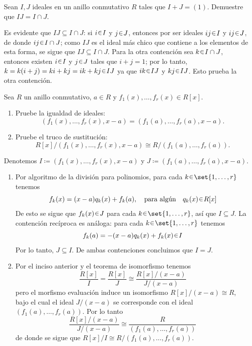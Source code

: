 \begin{ejer}
Sean $I , J$ ideales en un anillo conmutativo $R$ tales que $I + J = (1)$. Demuestre que $IJ = I \cap J$.
\end{ejer}
\begin{sol}[Demostración]
Es evidente que $IJ \subseteq I \cap J$: si $i \en I$ y $j \en J$, entonces por ser ideales $ij \en I$ y $ij \en J$, de donde $ij \en I \cap J$; como $IJ$ es el ideal más chico que contiene a los elementos de esta forma, se sigue que $IJ \subseteq I \cap J$. Para la otra contención sea $k \en I \cap J$, entonces existen $i \en I$ y $j \en J$ tales que $i + j = 1$; por lo tanto, $k = k(i + j) = ki + kj = ik + kj \en IJ$ ya que $ik \en IJ$ y $kj \en IJ$. Esto prueba la otra contención.
\end{sol}

\begin{ejer}
Sea $R$ un anillo conmutativo, $a \in R$ y $f_1(x), \ldots, f_r(x) \in R[x]$.
\begin{enumerate}[label=(\alph*)]
\item Pruebe la igualdad de ideales:
\[
(f_1(x), \ldots, f_r(x), x - a) = (f_1(a), \ldots, f_r(a), x - a).
\]
\item Pruebe el truco de sustitución:
\[
R[x]/(f_1(x), \ldots, f_r(x), x - a) \cong R/(f_1(a), \ldots, f_r(a)).
\]
\end{enumerate}
\end{ejer}
\begin{sol}[Demostración]
Denotemos $I \coloneq(f_1(x), \ldots, f_r(x), x - a)$ y $J \coloneq (f_1(a), \ldots, f_r(a), x - a)$.
\begin{enumerate}[label=(\alph*)]
\item Por algoritmo de la división para polinomios, para cada $k \en \set{1,\dots,r}$ tenemos
\[
f_k(x) = (x-a)q_k(x) + f_k(a),
\quad\text{para algún}\quad q_k(x) \en R[x]
\]
De esto se sigue que $f_k(x) \en J$ para cada $k \en \set{1,\dots,r}$, así que $I \subseteq J$. La contención recíproca es análoga: para cada $k \en \set{1,\dots,r}$ tenemos
\[
f_k(a) = -(x-a)q_k(x) + f_k(x) \en I
\]
Por lo tanto, $J \subseteq I$. De ambas contenciones concluimos que $I=J$.

\item Por el inciso anterior y el teorema de isomorfismo tenemos
\[
\frac{R[x]}{I} = \frac{R[x]}{J} \cong \frac{R[x]/(x-a)}{J/(x-a)}
\]
pero el morfismo evaluación induce un isomorfismo $R[x]/(x-a) \cong R$, bajo el cual el ideal $J/(x-a)$ se corresponde con el ideal $(f_1(a),\dots,f_r(a))$. Por lo tanto
\[
\frac{R[x]/(x-a)}{J/(x-a)} \cong \frac{R}{(f_1(a),\dots,f_r(a))}
\]
de donde se sigue que $R[x]/I \cong R/(f_1(a),\dots,f_r(a))$.
\end{enumerate}
\end{sol}

